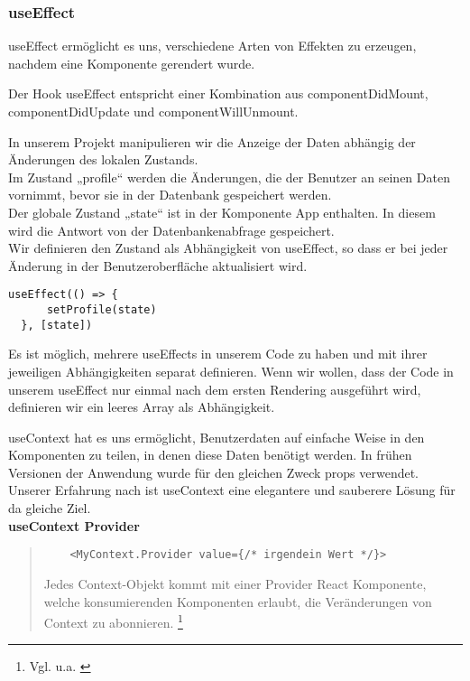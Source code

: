 \subsubsection{useEffect}
useEffect ermöglicht es uns, verschiedene Arten von Effekten zu erzeugen, nachdem eine Komponente gerendert wurde. 

Der Hook useEffect entspricht einer Kombination aus componentDidMount, componentDidUpdate und componentWillUnmount.

In unserem Projekt manipulieren wir die Anzeige der Daten abhängig der Änderungen des lokalen Zustands.\\
Im Zustand „profile“ werden die Änderungen, die der Benutzer an seinen Daten vornimmt, bevor sie in der Datenbank gespeichert werden.
\\
Der globale Zustand „state“ ist in der Komponente App enthalten.
In diesem wird die Antwort von der Datenbankenabfrage gespeichert.
\\
Wir definieren den Zustand als Abhängigkeit von useEffect, so dass er bei jeder Änderung in der Benutzeroberfläche aktualisiert wird.
\\
\begin{lstlisting}
useEffect(() => { 
      setProfile(state)      
  }, [state])           
\end{lstlisting}

Es ist möglich, mehrere useEffects in unserem Code zu haben und mit ihrer jeweiligen Abhängigkeiten separat definieren.
Wenn wir wollen, dass der Code in unserem useEffect nur einmal nach dem ersten Rendering ausgeführt wird, definieren wir ein leeres Array als Abhängigkeit.
\newpage

useContext hat es uns ermöglicht, Benutzerdaten auf einfache Weise in den Komponenten zu teilen, in denen diese Daten benötigt werden. In frühen Versionen der Anwendung wurde für den gleichen Zweck props verwendet.
Unserer Erfahrung nach ist useContext eine elegantere und sauberere Lösung für da gleiche Ziel.
\\
\textbf{useContext Provider} \\

\begin{quote}
    \begin{lstlisting}
    <MyContext.Provider value={/* irgendein Wert */}>
    \end{lstlisting}

    Jedes Context-Objekt kommt mit einer Provider React Komponente, welche konsumierenden Komponenten erlaubt, die Veränderungen von Context zu abonnieren.
    \footnote{Vgl. u.a. \cite{R02}}
    \end{quote}

